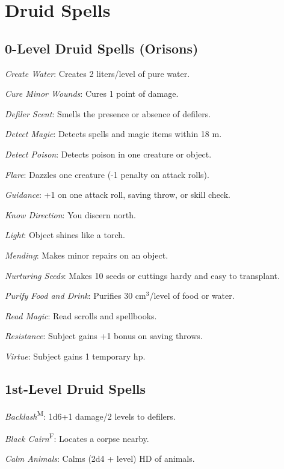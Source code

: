 \section{Druid Spells}



\subsection{0-Level Druid Spells (Orisons)}

\textit{Create Water}: Creates 2 liters/level of pure water.

\textit{Cure Minor Wounds}: Cures 1 point of damage.

\textit{Defiler Scent}: Smells the presence or absence of defilers.

\textit{Detect Magic}: Detects spells and magic items within 18 m.

\textit{Detect Poison}: Detects poison in one creature or object.

\textit{Flare}: Dazzles one creature (-1 penalty on attack rolls).

\textit{Guidance}: +1 on one attack roll, saving throw, or skill check.

\textit{Know Direction}: You discern north.

\textit{Light}: Object shines like a torch.

\textit{Mending}: Makes minor repairs on an object.

\textit{Nurturing Seeds}: Makes 10 seeds or cuttings hardy and easy to transplant.

\textit{Purify Food and Drink}: Purifies 30 cm$^3$/level of food or water.

\textit{Read Magic}: Read scrolls and spellbooks.

\textit{Resistance}: Subject gains +1 bonus on saving throws.

\textit{Virtue}: Subject gains 1 temporary hp.



\subsection{1st-Level Druid Spells}

\textit{Backlash}\textsuperscript{M}: 1d6+1 damage/2 levels to defilers.

\textit{Black Cairn}\textsuperscript{F}: Locates a corpse nearby.

\textit{Calm Animals}: Calms (2d4 + level) HD of animals.


